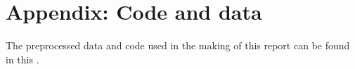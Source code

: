 \documentclass{article}
\begin{document}
	
	\def\code#1{\texttt{#1}}
	
	
	
	\newpage
	\tableofcontents
	
	\newpage
	
	
	\newpage
	
	\newpage
	
	\newpage
	
	\newpage
	
	
	\section{Appendix: Code and data} \label{appendix}
	
	The preprocessed data and code used in the making of this report can be found in this \href{https://github.com/cosmourao/sarcasm-project}{\color{blue}{repository}}.
	
	
\end{document}
